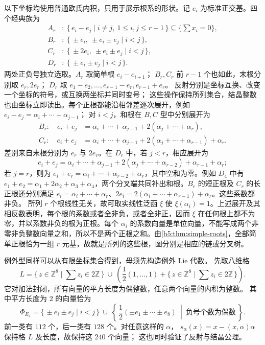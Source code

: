 以下坐标均使用普通欧氏内积，只用于展示根系的形状。记 \(e_i\) 为标准正交基。四个经典族为
\begin{equation}\label{b5:eq:classical-root-models}
	\begin{aligned}
		A_r&:\ \{\,e_i-e_j\mid i\ne j,\ 1\leq i,j\leq r+1\,\} \subseteq\{\textstyle\sum x_i=0\},\\
		B_r&:\ \{\,\pm e_i,\ \pm e_i\pm e_j\mid i<j\,\},\\
		C_r&:\ \{\,\pm2e_i,\ \pm e_i\pm e_j\mid i<j\,\},\\
		D_r&:\ \{\,\pm e_i\pm e_j\mid i<j\,\}.
	\end{aligned}
\end{equation}
两处正负号独立选取。\(A_r\) 取简单根 \(e_i-e_{i+1}\)； \(B_r,C_r\) 前 \(r-1\) 个也如此，末根分别取 \(e_r,2e_r\)； \(D_r\) 取 \(e_1-e_2,\ldots,e_{r-1}-e_r,e_{r-1}+e_r\)。 反射分别是坐标互换、改变一个坐标的符号，或互换两坐标并同时变号； 这些操作保持所列集合，结晶整数也由坐标立即读出。每个正根都能沿相邻差逐次展开，例如 \(e_i-e_j=\alpha_i+\cdots+\alpha_{j-1}\)； 对 \(i<j\)，和根在 \(B,C\) 型中分别展开为
\[
	\begin{aligned}
		B_r:\quad e_i+e_j&=\alpha_i+\cdots+\alpha_{j-1} +2(\alpha_j+\cdots+\alpha_r),\\
		C_r:\quad e_i+e_j&=\alpha_i+\cdots+\alpha_{j-1} +2(\alpha_j+\cdots+\alpha_{r-1})+\alpha_r.
	\end{aligned}
\]
差别来自末根分别为 \(e_r\) 与 \(2e_r\)。在 \(D_r\) 中，若 \(j<r\)，相应展开为
\[
	e_i+e_j=\alpha_i+\cdots+\alpha_{j-1} +2(\alpha_j+\cdots+\alpha_{r-2})+\alpha_{r-1}+\alpha_r;
\]
若 \(j=r\)，则为 \(e_i+e_r=\alpha_i+\cdots+\alpha_{r-2}+\alpha_r\)，其中空和为零。例如 \(D_4\) 中有 \(e_1+e_2=\alpha_1+2\alpha_2+\alpha_3+\alpha_4\)，两个分叉端共同补出和根。\(B_r\) 的短正根及 \(C_r\) 的长正根还分别满足 \(e_i=\alpha_i+\cdots+\alpha_r\)、\(2e_i=2(\alpha_i+\cdots+\alpha_{r-1})+\alpha_r\)。这些系数都非负。 所列 \(r\) 个根线性无关，故可取实线性泛函 \(\xi\) 使 \(\xi(\alpha_i)=1\)。上述展开及其相反数表明，每个根的系数或者全非负，或者全非正，因而 \(\xi\) 在任何根上都不为零，并以系数非负的根为正根。每个 \(\alpha_i\) 的系数向量是单位向量，不能写成两个非零非负整数向量之和，所以不是两个正根之和。由\cref{b5:thm:simple-roots}，全部简单正根恰为一组 \(r\) 元基，故就是所列的这些根，图分别是相应的链或分叉树。

\ProseParagraphBreak

例外型同样可以从有限坐标集合得到，毋须先构造例外 Lie 代数。 先取八维格
\[
	L=\{\,z\in\mathbb Z^8\mid\textstyle\sum z_i\in2\mathbb Z\,\} \ \cup\
	\left(\frac12(1,\ldots,1)+ \{\,z\in\mathbb Z^8\mid\textstyle\sum z_i\in2\mathbb Z\,\}\right).
\]
它对加法封闭，所有向量的平方长度为偶整数，任意两个向量的内积为整数。 其中平方长度为 \(2\) 的向量恰为
\begin{equation}\label{b5:eq:e8-root-model}
	\Phi_{E_8}= \{\,\pm e_i\pm e_j\mid i<j\,\} \ \cup\
	\left\{\,\frac12(\pm e_1\pm\cdots\pm e_8) \ \middle|\ \text{负号个数为偶数}\,\right\}.
\end{equation}
前一类有 \(112\) 个，后一类有 \(128\) 个。对任意这样的 \(\alpha\)， \(s_\alpha(x)=x-(x,\alpha)\alpha\) 保持格 \(L\) 及长度，故保持这 \(240\) 个向量； 这也同时验证了反射与结晶公理。

